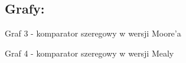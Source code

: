 \documentclass[12pt,a4paper]{article}
\begin{document}
		\subsection{Grafy:}
		
			\vspace{1.5cm}
			\begin{center}
				Graf 3 - komparator szeregowy w wersji Moore'a
			\end{center}
			
			\vspace{1.5cm}
			\begin{center}
				Graf 4 - komparator szeregowy w wersji Mealy
			\end{center}
	
\end{document}
